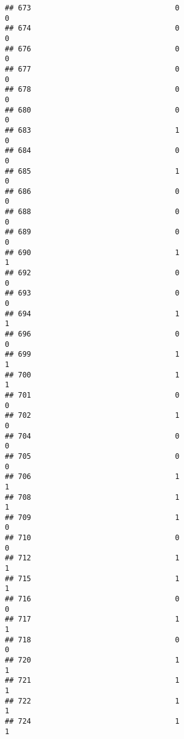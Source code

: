 \documentclass[
]{article}
\begin{document}
\begin{verbatim}
## 673                                 0                                0
## 674                                 0                                0
## 676                                 0                                0
## 677                                 0                                0
## 678                                 0                                0
## 680                                 0                                0
## 683                                 1                                0
## 684                                 0                                0
## 685                                 1                                0
## 686                                 0                                0
## 688                                 0                                0
## 689                                 0                                0
## 690                                 1                                1
## 692                                 0                                0
## 693                                 0                                0
## 694                                 1                                1
## 696                                 0                                0
## 699                                 1                                1
## 700                                 1                                1
## 701                                 0                                0
## 702                                 1                                0
## 704                                 0                                0
## 705                                 0                                0
## 706                                 1                                1
## 708                                 1                                1
## 709                                 1                                0
## 710                                 0                                0
## 712                                 1                                1
## 715                                 1                                1
## 716                                 0                                0
## 717                                 1                                1
## 718                                 0                                0
## 720                                 1                                1
## 721                                 1                                1
## 722                                 1                                1
## 724                                 1                                1

\end{verbatim}
\end{document}
